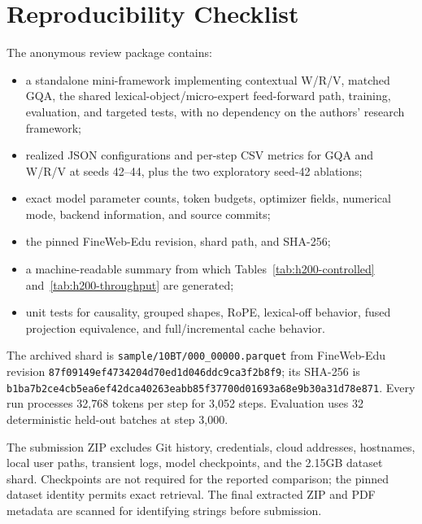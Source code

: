\section{Reproducibility Checklist}

The anonymous review package contains:
\begin{itemize}
    \item a standalone mini-framework implementing contextual W/R/V, matched GQA, the shared lexical-object/micro-expert feed-forward path, training, evaluation, and targeted tests, with no dependency on the authors' research framework;
    \item realized JSON configurations and per-step CSV metrics for GQA and W/R/V at seeds 42--44, plus the two exploratory seed-42 ablations;
    \item exact model parameter counts, token budgets, optimizer fields, numerical mode, backend information, and source commits;
    \item the pinned FineWeb-Edu revision, shard path, and SHA-256;
    \item a machine-readable summary from which Tables~\ref{tab:h200-controlled} and~\ref{tab:h200-throughput} are generated;
    \item unit tests for causality, grouped shapes, RoPE, lexical-off behavior, fused projection equivalence, and full/incremental cache behavior.
\end{itemize}

The archived shard is \texttt{sample/10BT/000\_00000.parquet} from FineWeb-Edu revision \texttt{87f09149ef4734204d70ed1d046ddc9ca3f2b8f9}; its SHA-256 is \texttt{b1ba7b2ce4cb5ea6ef42dca40263eabb85f37700d01693a68e9b30a31d78e871}. Every run processes 32,768 tokens per step for 3,052 steps. Evaluation uses 32 deterministic held-out batches at step 3,000.

The submission ZIP excludes Git history, credentials, cloud addresses, hostnames, local user paths, transient logs, model checkpoints, and the 2.15GB dataset shard. Checkpoints are not required for the reported comparison; the pinned dataset identity permits exact retrieval. The final extracted ZIP and PDF metadata are scanned for identifying strings before submission.